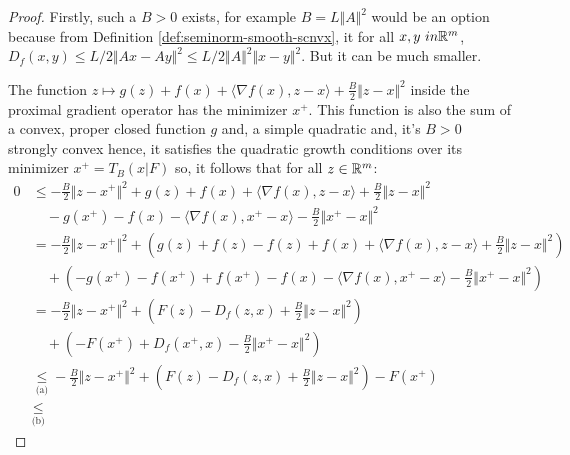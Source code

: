 \documentclass[12pt]{article}
\begin{document}
            \begin{proof}
                Firstly, such a $B > 0$ exists, for example $B = L\Vert A\Vert^2$ would be an option because from Definition \ref{def:seminorm-smooth-scnvx}, it for all $x, y \ in \mathbb R^{m}$, $D_f(x, y) \le L/2\Vert Ax - Ay \Vert^2 \le L/2\Vert A\Vert^2\Vert x - y\Vert^2$. 
                But it can be much smaller. 
                \par
                The function $z \mapsto g(z) + f(x) + \langle \nabla f(x), z - x\rangle + \frac{B}{2}\Vert z - x\Vert^2$ inside the proximal gradient operator has the minimizer $x^+$.  
                This function is also the sum of a convex, proper closed function $g$ and, a simple quadratic and, it's $B > 0$ strongly convex hence, it satisfies the quadratic growth conditions over its minimizer $x^+ = T_B(x|F)$ so, it follows that for all $z \in \mathbb R^m$: 
                \begin{align*}
                    0 &\le 
                    -\frac{B}{2}\Vert z - x^+\Vert^2 
                    + g(z) + f(x) + \langle \nabla f(x), z - x\rangle + \frac{B}{2}\Vert z - x\Vert^2
                        \\&\quad 
                        - g(x^+) - f(x) - \langle \nabla f(x), x^+ - x\rangle - \frac{B}{2}\Vert x^+ - x\Vert^2
                    \\
                    &= 
                    -\frac{B}{2}\Vert z - x^+\Vert^2 
                    + \left(g(z) + f(z) - f(z) + f(x) + \langle \nabla f(x), z - x\rangle + \frac{B}{2}\Vert z - x\Vert^2\right)
                        \\&\quad 
                        +\left(- g(x^+) - f(x^+) + f(x^+) - f(x) - \langle \nabla f(x), x^+ - x\rangle - \frac{B}{2}\Vert x^+ - x\Vert^2\right)
                    \\
                    &=
                    -\frac{B}{2}\Vert z - x^+\Vert^2 
                    + \left(F(z) - D_f(z, x) + \frac{B}{2}\Vert z - x\Vert^2\right)
                        \\&\quad
                        + \left(- F(x^+) + D_f(x^+, x) - \frac{B}{2}\Vert x^+ - x\Vert^2\right)
                    \\
                    &\underset{\text{(a)}}{\le }
                    -\frac{B}{2}\Vert z - x^+\Vert^2 
                    + \left(F(z) - D_f(z, x) + \frac{B}{2}\Vert z - x\Vert^2\right)
                    - F(x^+)
                    \\
                    &\underset{\text{(b)}}{\le} 

\end{align*}
\end{proof}
\end{document}

